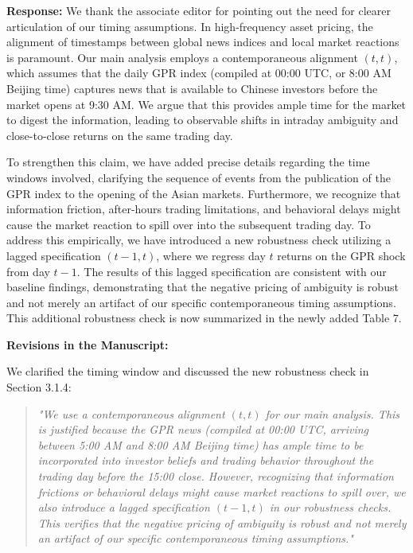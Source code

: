 \documentclass[12pt]{article}
\begin{document}
\begin{highlightbox}
\textbf{Response:} We thank the associate editor for pointing out the need for clearer articulation of our timing assumptions. In high-frequency asset pricing, the alignment of timestamps between global news indices and local market reactions is paramount. Our main analysis employs a contemporaneous alignment $(t, t)$, which assumes that the daily GPR index (compiled at 00:00 UTC, or 8:00 AM Beijing time) captures news that is available to Chinese investors before the market opens at 9:30 AM. We argue that this provides ample time for the market to digest the information, leading to observable shifts in intraday ambiguity and close-to-close returns on the same trading day.

To strengthen this claim, we have added precise details regarding the time windows involved, clarifying the sequence of events from the publication of the GPR index to the opening of the Asian markets. Furthermore, we recognize that information friction, after-hours trading limitations, and behavioral delays might cause the market reaction to spill over into the subsequent trading day. To address this empirically, we have introduced a new robustness check utilizing a lagged specification $(t-1, t)$, where we regress day $t$ returns on the GPR shock from day $t-1$. The results of this lagged specification are consistent with our baseline findings, demonstrating that the negative pricing of ambiguity is robust and not merely an artifact of our specific contemporaneous timing assumptions. This additional robustness check is now summarized in the newly added Table 7.
\end{highlightbox}

\begin{highlightbox}
\textbf{Revisions in the Manuscript:}

We clarified the timing window and discussed the new robustness check in Section 3.1.4:
\vspace{0.2cm}
\begin{quote}
\color{red}\itshape "We use a contemporaneous alignment $(t, t)$ for our main analysis. This is 
\color{red}\itshape justified because the GPR news (compiled at 00:00 UTC, arriving between 5:00 AM and 8:00 AM Beijing time) has ample time to be incorporated into investor beliefs and trading behavior throughout the trading day before the 15:00 close. However, recognizing that information frictions or behavioral delays might cause market reactions to spill over, we also introduce a lagged specification $(t-1, t)$ in our robustness checks. This verifies that the negative pricing of ambiguity is robust and not merely an artifact of our specific contemporaneous timing assumptions."
\end{quote}
\end{highlightbox}
\end{document}
